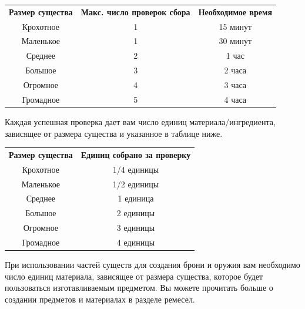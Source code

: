 \documentclass[a4paper, 9pt, twocolumn]{book}
\begin{document}
	\begin{table}[H]
		
		\centering
		
		\begin{tabularx}{\linewidth}{C C C}
			\textbf{Размер существа} & \textbf{Макс. число проверок сбора} & \textbf{Необходимое время}\\
			Крохотное & 1 & 15 минут\\
			Маленькое & 1 & 30 минут\\
			Среднее & 2 & 1 час\\
			Большое & 3 & 2 часа\\
			Огромное & 4 & 3 часа\\
			Громадное & 5 & 4 часа\\
		\end{tabularx}
	\end{table}
	
	Каждая успешная проверка дает вам число единиц материала/ингредиента, зависящее от размера существа и указанное в таблице ниже.
	
	\begin{table}[H]
		
		\centering
		
		\begin{tabularx}{\linewidth}{c c}
			\textbf{Размер существа} & \textbf{Единиц собрано за проверку}\\
			\cellcolor{altertable}Крохотное & \cellcolor{altertable}1/4 единицы\\
			Маленькое & 1/2 единицы\\
			\cellcolor{altertable}Среднее & \cellcolor{altertable}1 единица\\
			Большое & 2 единицы\\
			\cellcolor{altertable}Огромное & \cellcolor{altertable}3 единицы\\
			Громадное & 4 единицы\\
		\end{tabularx}
	\end{table}
	
	При использовании частей существ для создания брони и оружия вам необходимо число единиц материала, зависящее от размера существа, которое будет пользоваться изготавливаемым предметом. Вы можете прочитать больше о создании предметов и материалах в разделе ремесел.
	
\end{document}
